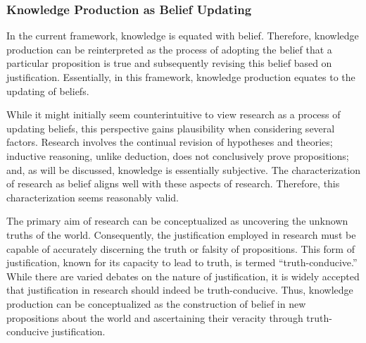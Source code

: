\subsubsection{Knowledge Production as Belief Updating}
In the current framework, knowledge is equated with belief. Therefore, knowledge production can be reinterpreted as the process of adopting the belief that a particular proposition is true and subsequently revising this belief based on justification. Essentially, in this framework, knowledge production equates to the updating of beliefs.

While it might initially seem counterintuitive to view research as a process of updating beliefs, this perspective gains plausibility when considering several factors. Research involves the continual revision of hypotheses and theories; inductive reasoning, unlike deduction, does not conclusively prove propositions; and, as will be discussed, knowledge is essentially subjective. The characterization of research as belief aligns well with these aspects of research. Therefore, this characterization seems reasonably valid.

The primary aim of research can be conceptualized as uncovering the unknown truths of the world. Consequently, the justification employed in research must be capable of accurately discerning the truth or falsity of propositions. This form of justification, known for its capacity to lead to truth, is termed ``truth-conducive.'' While there are varied debates on the nature of justification, it is widely accepted that justification in research should indeed be truth-conducive. Thus, knowledge production can be conceptualized as the construction of belief in new propositions about the world and ascertaining their veracity through truth-conducive justification.



